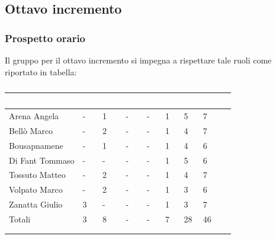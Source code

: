     \subsection{Ottavo incremento} 
    {
    \subsubsection{Prospetto orario}
    {
    Il gruppo per il ottavo incremento si impegna a rispettare tale ruoli come riportato in tabella:
      \setlength{\freewidth}{\dimexpr\textwidth-30\tabcolsep}
      \renewcommand{\arraystretch}{1.0}
      \setlength{\aboverulesep}{0pt}
      \setlength{\belowrulesep}{0pt}
      \begin{longtable}{C{.4\freewidth} C{.1\freewidth} C{.1\freewidth} C{.1\freewidth} C{.1\freewidth} C{.1\freewidth} C{.1\freewidth} C{.1\freewidth} C{.1\freewidth}}
      \toprule
      \textcolor{white}{\textbf{Componente}}&
      \textcolor{white}{\textbf{Re}}&
      \textcolor{white}{\textbf{Am}}&
      \textcolor{white}{\textbf{An}}&
      \textcolor{white}{\textbf{Pt}}&
      \textcolor{white}{\textbf{Pr}}&
      \textcolor{white}{\textbf{Ve}}&
      \textcolor{white}{\textbf{Ore}}\\
      \toprule
      \endhead

      Arena Angela & - & 1 & -  & - & 1 & 5 & 7 \\      
      Bellò Marco & - & 2 & - & - & 1 & 4 & 7 \\      
      Bousapnamene & - & 1 & - & - & 1 & 4 & 6 \\      
      Di Fant Tommaso & - & - & - & - & 1 & 5 & 6 \\      
      Tossuto Matteo & - & 2 & - & - & 1 & 4 & 7 \\      
      Volpato Marco & - & 2 & - & - & 1 & 3 & 6 \\      
      Zanatta Giulio & 3 & - & - & - & 1 & 3 & 7 \\      
      Totali & 3 & 8 & - & - & 7 & 28 & 46 \\
      \bottomrule  
      \\
      \caption{}

      \end{longtable} 

}}
